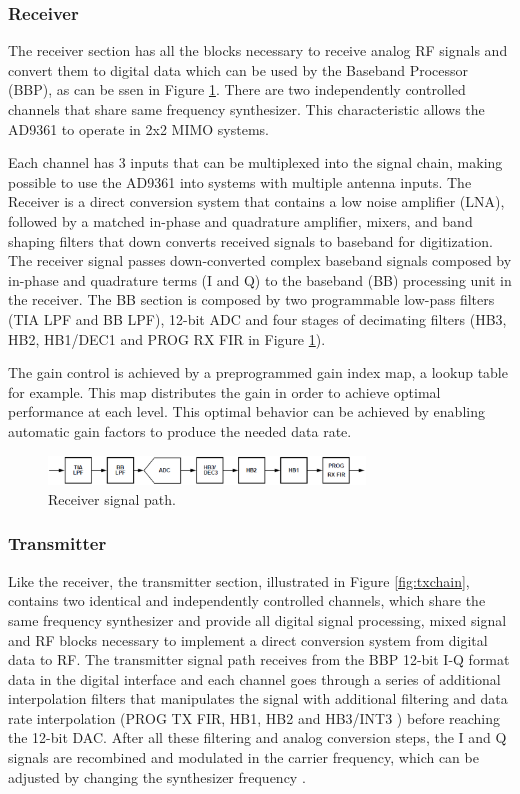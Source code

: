 \subsubsection{Receiver}

The receiver section has all the blocks necessary to receive analog RF signals
and convert them to digital data which can be used by the Baseband Processor
(BBP), as can be ssen in Figure \ref{fig:rxchain}. There are two independently
controlled channels that share same frequency synthesizer. This characteristic
allows the AD9361 to operate in  2x2 MIMO systems.

Each channel has 3 inputs that can be multiplexed into the signal chain, making
possible to use the AD9361 into systems with multiple antenna inputs. The
Receiver is a direct conversion system that contains a low noise amplifier
(LNA), followed by a matched in-phase and quadrature amplifier, mixers, and band
shaping filters that down converts received signals to baseband for
digitization. The
receiver signal passes down-converted complex baseband signals composed by
in-phase and quadrature terms (I and Q) to the baseband (BB) processing unit in
the receiver. The BB section is composed by two programmable low-pass filters
(TIA LPF and BB LPF), 12-bit ADC and four stages of decimating filters (HB3,
HB2, HB1/DEC1 and PROG RX FIR in Figure \ref{fig:rxchain}).

The gain control is achieved by a preprogrammed gain index map, a lookup table
for example. This map distributes the gain in order to achieve optimal
performance at each level. This optimal behavior can be achieved by enabling
automatic gain factors to produce the needed data rate.

\begin{figure}[htbp]
    \centering
    \includegraphics[width=0.75\textwidth]{./figures/rx_chain}
    \caption{ Receiver signal path.
    \label{fig:rxchain}}
\end{figure}


\subsubsection{Transmitter}

Like the receiver, the transmitter section, illustrated in Figure
\ref{fig:txchain}, contains two identical and independently controlled channels,
which share the same frequency synthesizer and provide all digital signal
processing, mixed signal and RF blocks necessary to implement a direct
conversion system from digital data to RF. The transmitter signal path receives
from the BBP 12-bit I-Q format data in the digital interface and each channel
goes through a series of additional interpolation filters that manipulates the
signal with additional filtering and data rate interpolation (PROG TX FIR, HB1,
HB2 and HB3/INT3 ) before reaching the 12-bit DAC. After all these filtering and
analog conversion steps, the I and Q signals are recombined and modulated in the
carrier frequency, which can be adjusted by changing the synthesizer frequency
\cite{ad:ad9361}.

